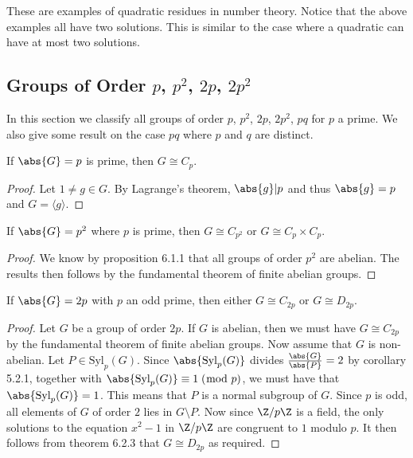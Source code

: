 \documentclass[a4paper]{article}
\begin{document}
These are examples of quadratic residues in number theory. Notice that the above examples all have two solutions. This is similar to the case where a quadratic can have at most two solutions. 


\subsection{Groups of Order $p$, $p^2$, $2p$, $2p^2$}
In this section we classify all groups of order $p$, $p^2$, $2p$, $2p^2$, $pq$ for $p$ a prime. We also give some result on the case $pq$ where $p$ and $q$ are distinct. 

\begin{prp}{}{} If $\abs{G}=p$ is prime, then $G\cong C_p$. 
\begin{proof}
Let $1\neq g\in G$. By Lagrange's theorem, $\abs{g}|p$ and thus $\abs{g}=p$ and $G=\langle g\rangle$. 
\end{proof}
\end{prp}

\begin{prp}{}{} If $\abs{G}=p^2$ where $p$ is prime, then $G\cong C_{p^2}$ or $G\cong C_p\times C_p$. 
\begin{proof}
We know by proposition 6.1.1 that all groups of order $p^2$ are abelian. The results then follows by the fundamental theorem of finite abelian groups. 
\end{proof}
\end{prp}

\begin{prp}{}{} If $\abs{G}=2p$ with $p$ an odd prime, then either $G\cong C_{2p}$ or $G\cong D_{2p}$. 
\begin{proof}
Let $G$ be a group of order $2p$. If $G$ is abelian, then we must have $G\cong C_{2p}$ by the fundamental theorem of finite abelian groups. Now assume that $G$ is non-abelian. Let $P\in\text{Syl}_p(G)$. Since $\abs{\text{Syl}_p(G)}$ divides $\frac{\abs{G}}{\abs{P}}=2$ by corollary 5.2.1, together with $\abs{\text{Syl}_p(G)}\equiv 1\;(\bmod\;p)$, we must have that $\abs{\text{Syl}_p(G)}=1$. This means that $P$ is a normal subgroup of $G$. Since $p$ is odd, all elements of $G$ of order $2$ lies in $G\setminus P$. Now since $\Z/p\Z$ is a field, the only solutions to the equation $x^2-1$ in $\Z/p\Z$ are congruent to $1$ modulo $p$. It then follows from theorem 6.2.3 that $G\cong D_{2p}$ as required. 
\end{proof}
\end{prp}
\end{document}
